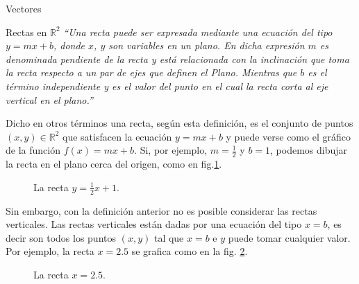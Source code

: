 \documentclass[a4paper,12pt,twoside,spanish,reqno]{amsbook}
\theoremstyle{definition}
\theoremstyle{remark}
\newcommand{\R}{\mathbb R}
\begin{document}
\begin{chapter}{Vectores}
\begin{section}{Rectas en $\R^2$}
	\textit{``Una recta puede ser expresada mediante una ecuación del tipo $y = m x + b$, donde $x$, $y$ son variables en un plano. En dicha expresión $m$ es denominada pendiente de la recta y está relacionada con la inclinación que toma la recta respecto a un par de ejes que definen el Plano. Mientras que $b$ es el término independiente y es el valor del punto en el cual la recta corta al eje vertical en el plano.''}
	
	Dicho en otros términos una recta,  según esta definición, es el conjunto de puntos $(x,y) \in \R^2$ que satisfacen la ecuación $y = m x + b$ y puede verse como el gráfico de la función $f(x) = m x + b$. Si, por ejemplo, $m=\frac12$ y $b=1$, podemos dibujar la recta en el plano cerca del origen, como en fig.\ref{fig-recta-funcion}.
	\begin{figure}[h]
		\caption{La recta $y = \frac12x +1$.}
		\label{fig-recta-funcion}
	\end{figure} 
	
	Sin embargo, con la definición anterior no es posible considerar las rectas verticales. Las rectas verticales están dadas por una ecuación del tipo $x= b$,  es decir son todos los puntos $(x,y)$  tal que $x=b$ e $y$ puede tomar cualquier valor. Por ejemplo, la recta $x=2.5$ se  grafica  como en la fig. \ref{fig-recta-vertical}.
	\begin{figure}[h]
		\caption{La recta $x=2.5$.}
		\label{fig-recta-vertical}
	\end{figure} 
	

\end{section}
\end{chapter}
\end{document}
